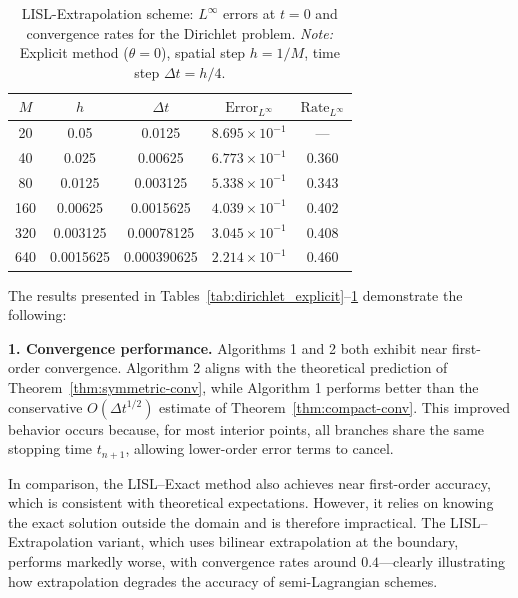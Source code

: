 \documentclass[11pt]{article}
\theoremstyle{mythm}
\theoremstyle{definition}
\begin{document}
	\begin{table}[htb]
		\centering
		\caption{LISL-Extrapolation scheme: $L^\infty$ errors at $t=0$ and convergence rates for the Dirichlet problem.  
			\emph{Note:} Explicit method ($\theta=0$), spatial step $h=1/M$, time step $\Delta t=h/4$.}
		\label{tab:lisl_extrapolation}
		\small
		\begin{tabular}{ccccc}
			\hline
			$M$ & $h$ & $\Delta t$ & $\text{Error}_{L^{\infty}}$ & $\text{Rate}_{L^{\infty}}$ \\
			\hline
			20  & 0.05       & 0.0125      & $8.695 \times 10^{-1}$ & ---    \\
			40  & 0.025      & 0.00625     & $6.773 \times 10^{-1}$ & 0.360  \\
			80  & 0.0125     & 0.003125    & $5.338 \times 10^{-1}$ & 0.343  \\
			160 & 0.00625    & 0.0015625   & $4.039 \times 10^{-1}$ & 0.402  \\
			320 & 0.003125   & 0.00078125  & $3.045 \times 10^{-1}$ & 0.408  \\
			640 & 0.0015625  & 0.000390625 & $2.214 \times 10^{-1}$ & 0.460  \\
			\hline
		\end{tabular}
	\end{table}
	
	
	\newpage
	
	
	The results presented in Tables~\ref{tab:dirichlet_explicit}--\ref{tab:lisl_extrapolation} demonstrate the following:
	
	\textbf{1. Convergence performance.}
	Algorithms 1 and 2 both exhibit near first-order convergence. Algorithm 2 aligns with the theoretical prediction of Theorem~\ref{thm:symmetric-conv}, while Algorithm 1 performs better than the conservative $O(\Delta t^{1/2})$ estimate of Theorem~\ref{thm:compact-conv}. This improved behavior occurs because, for most interior points, all branches share the same stopping time $t_{n+1}$, allowing lower-order error terms to cancel.
	
	In comparison, the LISL--Exact method also achieves near first-order accuracy, which is consistent with theoretical expectations. However, it relies on knowing the exact solution outside the domain and is therefore impractical. The LISL--Extrapolation variant, which uses bilinear extrapolation at the boundary, performs markedly worse, with convergence rates around $0.4$---clearly illustrating how  extrapolation  degrades the accuracy of semi-Lagrangian schemes.
	
\end{document}
